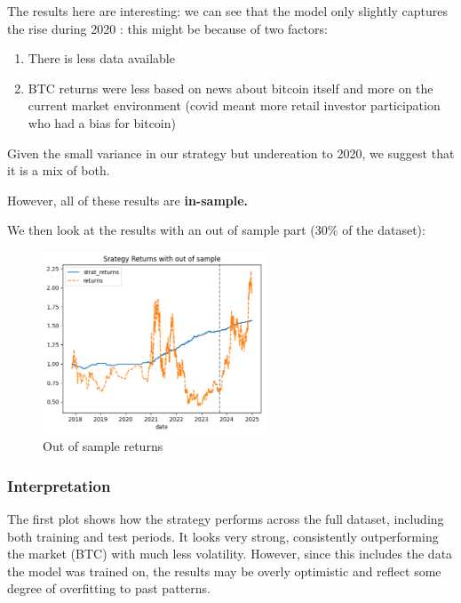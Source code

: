 \documentclass[
  a4paper]{article}
\begin{document}
The results here are interesting: we can see that the model only
slightly captures the rise during 2020 : this might be because of two
factors:

\begin{enumerate}
\def\labelenumi{\arabic{enumi}.}
\item
  There is less data available
\item
  BTC returns were less based on news about bitcoin itself and more on
  the current market environment (covid meant more retail investor
  participation who had a bias for bitcoin)
\end{enumerate}

Given the small variance in our strategy but undereation to 2020, we
suggest that it is a mix of both.

However, all of these results are \textbf{in-sample.}

We then look at the results with an out of sample part (30\% of the
dataset):\\

\begin{figure}

{\centering \includegraphics[width=2.60417in,height=\textheight]{graphs/strat_out_sample.png}

}

\caption{Out of sample returns}

\end{figure}

\hypertarget{interpretation-2}{%
\subsubsection{Interpretation}\label{interpretation-2}}

The first plot shows how the strategy performs across the full dataset,
including both training and test periods. It looks very strong,
consistently outperforming the market (BTC) with much less volatility.
However, since this includes the data the model was trained on, the
results may be overly optimistic and reflect some degree of overfitting
to past patterns.
\end{document}
